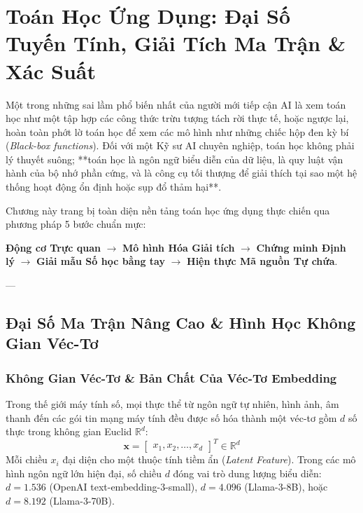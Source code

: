 
\chapter{Toán Học Ứng Dụng: Đại Số Tuyến Tính, Giải Tích Ma Trận \& Xác Suất}
\label{ch:applied-mathematics}

Một trong những sai lầm phổ biến nhất của người mới tiếp cận AI là xem toán học như một tập hợp các công thức trừu tượng tách rời thực tế, hoặc ngược lại, hoàn toàn phớt lờ toán học để xem các mô hình như những chiếc hộp đen kỳ bí (\textit{Black-box functions}). Đối với một Kỹ sư AI chuyên nghiệp, toán học không phải lý thuyết suông; **toán học là ngôn ngữ biểu diễn của dữ liệu, là quy luật vận hành của bộ nhớ phần cứng, và là công cụ tối thượng để giải thích tại sao một hệ thống hoạt động ổn định hoặc sụp đổ thảm hại**.

Chương này trang bị toàn diện nền tảng toán học ứng dụng thực chiến qua phương pháp 5 bước chuẩn mực:
\begin{center}
\textbf{Động cơ Trực quan} $\longrightarrow$ \textbf{Mô hình Hóa Giải tích} $\longrightarrow$ \textbf{Chứng minh Định lý} $\longrightarrow$ \textbf{Giải mẫu Số học bằng tay} $\longrightarrow$ \textbf{Hiện thực Mã nguồn Tự chứa}.
\end{center}

---

\section{Đại Số Ma Trận Nâng Cao \& Hình Học Không Gian Véc-Tơ}
\label{sec:linear-algebra-deepdive}

\subsection{Không Gian Véc-Tơ \& Bản Chất Của Véc-Tơ Embedding}
Trong thế giới máy tính số, mọi thực thể từ ngôn ngữ tự nhiên, hình ảnh, âm thanh đến các gói tin mạng máy tính đều được số hóa thành một véc-tơ gồm $d$ số thực trong không gian Euclid $\mathbb{R}^d$:
\begin{equation}
\mathbf{x} = \begin{bmatrix} x_1, x_2, \dots, x_d \end{bmatrix}^T \in \mathbb{R}^d
\end{equation}
Mỗi chiều $x_i$ đại diện cho một thuộc tính tiềm ẩn (\textit{Latent Feature}). Trong các mô hình ngôn ngữ lớn hiện đại, số chiều $d$ đóng vai trò dung lượng biểu diễn: $d = 1.536$ (OpenAI text-embedding-3-small), $d = 4.096$ (Llama-3-8B), hoặc $d = 8.192$ (Llama-3-70B).

